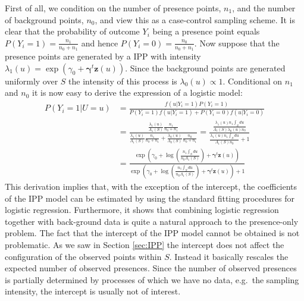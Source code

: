 First of all, we condition on the number of presence points, $n_1$, and the number of background points, $n_0$, and view this as a case-control sampling scheme. It is clear that the probability of outcome $Y_i$ being a presence point equals $P(Y_i = 1) = \frac{n_1}{n_0 + n_1}$ and hence $P(Y_i = 0) = \frac{n_0}{n_0 + n_1}$. Now suppose that the presence points are generated by a IPP with intensity $\lambda_1(u) = \exp(\gamma_0 + \bm{\gamma}^t\bm{z}(u))$. Since the background points are generated uniformly over $S$ the intensity of this process is $\lambda_0(u) \propto 1.$ Conditional on $n_1$ and $n_0$ it is now easy to derive the expression of a logistic model:
\begin{equation}
\label{eq:IPPSampling}
\begin{aligned}
P(Y_i = 1 | U = u) & = \frac{f(u|Y_i = 1) P(Y_i = 1)}{P(Y_i = 1) f(u|Y_i = 1) + P(Y_i = 0)f(u|Y_i = 0) } \\[0.5ex]
 & = \frac{\frac{\lambda_1(u)}{\Lambda_1(S)}\frac{n_1}{n_0 + n_1}}{\frac{\lambda_1(u)}{\Lambda_1(S)}\frac{n_1}{n_0 + n_1} + \frac{\lambda_0(u)}{\Lambda_0(S)}\frac{n_0}{n_0 + n_1}} 
 = \frac{\frac{\lambda_1(u) n_1 \int_S du }{\Lambda_1(S)\lambda_0(u) n_0}}{\frac{ \lambda_1(u) n_1 \int_S du}{\Lambda_1(S) n_0} + 1} \\[0.5ex]
 & = \frac{\exp \left( \gamma_0 + \log \left( \frac{n_1 \int_S du }{n_0\Lambda_1(S)}\right) + \bm{\gamma}^t\bm{z}(u) \right)}{\exp \left( \gamma_0 + \log \left( \frac{n_1 \int_S du }{n_0\Lambda_1(S)}\right) + \bm{\gamma}^t\bm{z}(u) \right) + 1}
\end{aligned}
\end{equation}
This derivation implies that, with the exception of the intercept, the coefficients of the IPP model can be estimated by using the standard fitting procedures for logistic regression. Furthermore, it shows that combining logistic regression together with back-ground data is quite a natural approach to the presence-only problem. The fact that the intercept of the IPP model cannot be obtained is not problematic. As we saw in Section \ref{sec:IPP} the intercept does not affect the configuration of the observed points within $S$. Instead it basically rescales the expected number of observed presences. Since the number of observed presences is partially determined by processes of which we have no data, e.g.\ the sampling intensity, the intercept is usually not of interest.


